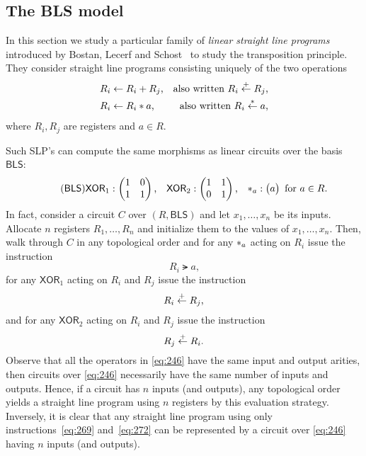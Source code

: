 \subsection{The BLS model}
\label{sec:bls-model}
In this section we study a particular family of \emph{linear straight
  line programs} introduced by Bostan, Lecerf and
Schost~\cite{bostan+lecerf+schost:tellegen} to study the transposition
principle. They consider straight line programs consisting uniquely of
the two operations
\begin{align}
  \label{eq:269}
  R_i &\leftarrow R_i + R_j
  \text{,}
  &\text{also written }
  R_i \overset{+}{\leftarrow} R_j
  \text{,}\\
  \label{eq:272}
  R_i &\leftarrow R_i * a
  \text{,}
  &\text{also written }
  R_i \overset{*}{\leftarrow} a
  \text{,}
\end{align}
where $R_i,R_j$ are registers and $a\in R$. 

Such SLP's can compute the same morphisms as linear circuits
over the basis $\mathsf{BLS}$:
\begin{equation}
  \tag{$\mathsf{BLS}$}
  \label{eq:246}
  \mathsf{XOR}_1 :
  \begin{pmatrix}
    1 & 0\\1 & 1
  \end{pmatrix}
  \text{,}\quad
  \mathsf{XOR}_2 :
  \begin{pmatrix}
    1 & 1\\0 & 1
  \end{pmatrix}
  \text{,}\quad
  \rmul{a} :
  \begin{pmatrix}
    a
  \end{pmatrix}
  \text{ for $a\in R$.}
\end{equation}
In fact, consider a circuit $C$ over $(R,\mathsf{BLS})$ and let
$x_1,\ldots,x_n$ be its inputs. Allocate $n$ registers
$R_1,\ldots,R_n$ and initialize them to the values of
$x_1,\ldots,x_n$. Then, walk through $C$ in any topological order and
for any $*_{a}$ acting on $R_i$ issue the instruction
\begin{equation}
  \label{eq:249}
  R_i \lat a
  \text{,}
\end{equation}
for any $\mathsf{XOR}_1$ acting on $R_i$ and $R_j$ issue the
instruction
\begin{equation}
  \label{eq:255}
  R_i \overset{+}{\leftarrow} R_j
  \text{,}
\end{equation}
and for any $\mathsf{XOR}_2$ acting on $R_i$ and $R_j$ issue the
instruction
\begin{equation}
  \label{eq:256}
  R_j \overset{+}{\leftarrow} R_i
  \text{.}
\end{equation}
Observe that all the operators in \ref{eq:246} have the same input and
output arities, then circuits over \ref{eq:246} necessarily have the
same number of inputs and outputs. Hence, if a circuit has $n$ inputs
(and outputs), any topological order yields a straight line program
using $n$ registers by this evaluation strategy.  Inversely, it is
clear that any straight line program using only
instructions~\eqref{eq:269} and~\eqref{eq:272} can be represented by a
circuit over \ref{eq:246} having $n$ inputs (and outputs).


